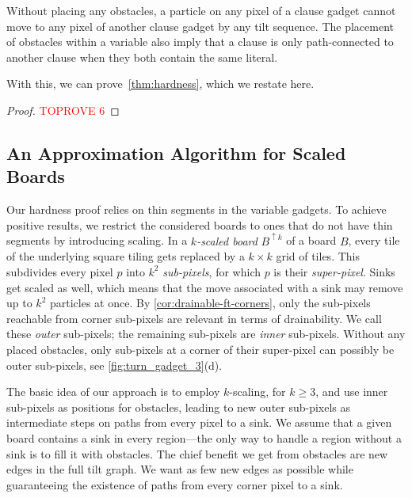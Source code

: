 \documentclass[a4paper,UKenglish,cleveref,thm-restate]{lipics-v2021}
\newcommand{\bScale}[2][k]{\ensuremath{{#2}^{\uparrow {#1}}}}
\begin{document}
\begin{observation}
	\label{obs:clauseToClause}
	Without placing any obstacles, a particle on any pixel of a clause gadget cannot move to any pixel of another clause gadget by any tilt sequence.
	The placement of obstacles within a variable also imply that a clause is only path-connected to another clause when they both contain the same literal.
\end{observation}

With this, we can prove~\cref{thm:hardness}, which we restate here.

\tiltFillabilityHardness*

\begin{proof}\textcolor{red}{TOPROVE 6}\end{proof}




 
\subsection{An Approximation Algorithm for Scaled Boards}\label{subsec:approx}

Our hardness proof relies on thin segments in the variable gadgets. To achieve
positive results, we restrict the considered boards to ones that do not have
thin segments by introducing scaling. In a \emph{$k$-scaled board} $\bScale{B}$
of a board $B$, every tile of the underlying square tiling gets replaced by a
$k \times k$ grid of tiles. This subdivides every pixel $p$ into $k^2$
\emph{sub-pixels}, for which $p$ is their \emph{super-pixel}. Sinks get scaled
as well, which means that the move associated with a sink may remove up to $k^2$
particles at once. By \cref{cor:drainable-ft-corners}, only the sub-pixels reachable
from corner sub-pixels are relevant in terms of drainability. We call these
\emph{outer} sub-pixels; the remaining sub-pixels are \emph{inner}
sub-pixels. Without any placed obstacles, only sub-pixels at a corner of their
super-pixel can possibly be outer sub-pixels, see \cref{fig:turn_gadget_3}(d).

The basic idea of our approach is to employ $k$-scaling, for $k \geq 3$, and use
inner sub-pixels as positions for obstacles, leading to new outer sub-pixels as intermediate steps on
paths from every pixel to a sink. We assume that a given board contains a
sink in every region---the only way to handle a region without a sink is to fill
it with obstacles. The chief benefit we get from obstacles are
new edges in the full tilt graph. We want as
few new edges as possible while guaranteeing the existence of paths from
every corner pixel to a sink.
\end{document}

